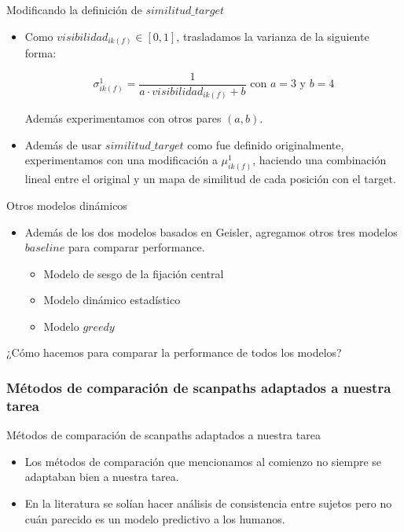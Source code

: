 \documentclass[compress]{beamer}
\begin{document}
\begin{frame}{Modificando la definición de $similitud\_target$}
\begin{itemize}
\item Como $visibilidad_{ik(f)} \in [0,1]$, trasladamos la varianza de la siguiente forma:

$$ \sigma_{ik(f)}^1 = \displaystyle\frac{1}{a \cdot visibilidad_{ik(f)} + b} \text{ con } a = 3 \text{ y } b = 4$$ 

Además experimentamos con otros pares $(a,b)$.
\item Además de usar $similitud\_target$ como fue definido originalmente, experimentamos con una modificación a $\mu^1_{ik(f)}$, haciendo una combinación lineal entre el original y un mapa de similitud de cada posición con el target.

\end{itemize}
\end{frame}

\begin{frame}{Otros modelos dinámicos}
\begin{itemize}
\item Además de los dos modelos basados en Geisler, agregamos otros tres modelos $baseline$ para comparar performance.
\begin{itemize}
\item Modelo de sesgo de la fijación central
\item Modelo dinámico estadístico
\item Modelo $greedy$
\end{itemize}
\end{itemize}

\bigskip
¿Cómo hacemos para comparar la performance de todos los modelos?

\end{frame}

\subsubsection{Métodos de comparación de scanpaths adaptados a nuestra tarea}
\begin{frame}{Métodos de comparación de scanpaths adaptados a nuestra tarea}

\begin{itemize}
\item Los métodos de comparación que mencionamos al comienzo no siempre se adaptaban bien a nuestra tarea.
\item En la literatura se solían hacer análisis de consistencia entre sujetos pero no cuán parecido es un modelo predictivo a los humanos.
\end{itemize}
\end{frame}
\end{document}
